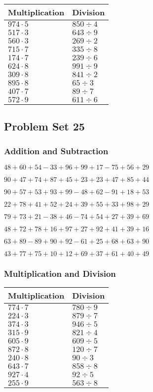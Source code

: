 \begin{longtable}[]{@{}ll@{}}
\toprule
Multiplication & Division\tabularnewline
\midrule
\endhead
\(974\cdot5\) & \(850÷4\)\tabularnewline
\(517\cdot3\) & \(643÷9\)\tabularnewline
\(560\cdot3\) & \(269÷2\)\tabularnewline
\(715\cdot7\) & \(335÷8\)\tabularnewline
\(174\cdot7\) & \(239÷6\)\tabularnewline
\(624\cdot8\) & \(991÷9\)\tabularnewline
\(309\cdot8\) & \(841÷2\)\tabularnewline
\(895\cdot8\) & \(65÷3\)\tabularnewline
\(407\cdot7\) & \(89÷7\)\tabularnewline
\(572\cdot9\) & \(611÷6\)\tabularnewline
\bottomrule
\end{longtable}

\hypertarget{problem-set-25}{%
\subsection{Problem Set 25}\label{problem-set-25}}

\hypertarget{addition-and-subtraction-24}{%
\subsubsection{Addition and
Subtraction}\label{addition-and-subtraction-24}}

\(48+60+54-33+96+99+17-75+56+29\)

\(90+47+74+87+45+23+23+47+85+44\)

\(90+57+53+93+99-48+62-91+18+53\)

\(22+78+41+52+24+39+55+33+98+29\)

\(79+73+21-38+46-74+54+27+39+69\)

\(48+72+78+16+97+27+92+41+39+16\)

\(63+89-89+90+92-61+25+68+63+90\)

\(43+77+75+10+12+69+37+61+40+49\)

\hypertarget{multiplication-and-division-24}{%
\subsubsection{Multiplication and
Division}\label{multiplication-and-division-24}}

\begin{longtable}[]{@{}ll@{}}
\toprule
Multiplication & Division\tabularnewline
\midrule
\endhead
\(774\cdot7\) & \(780÷9\)\tabularnewline
\(224\cdot3\) & \(879÷7\)\tabularnewline
\(374\cdot3\) & \(946÷5\)\tabularnewline
\(315\cdot9\) & \(821÷4\)\tabularnewline
\(605\cdot9\) & \(609÷5\)\tabularnewline
\(872\cdot8\) & \(120÷7\)\tabularnewline
\(240\cdot8\) & \(90÷3\)\tabularnewline
\(643\cdot7\) & \(858÷8\)\tabularnewline
\(927\cdot4\) & \(92÷5\)\tabularnewline
\(255\cdot9\) & \(563÷8\)\tabularnewline
\bottomrule
\end{longtable}


